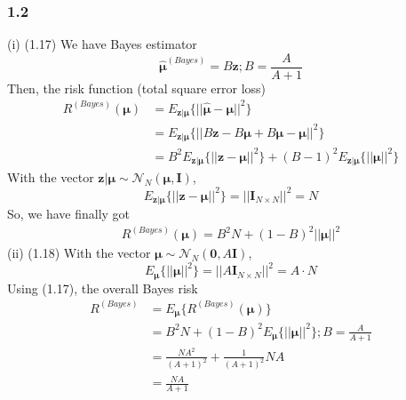 \documentclass{article}
\begin{document}
\subsubsection*{1.2}
(i) (1.17) \newline
We have Bayes estimator
\begin{displaymath}
\hat{\bm{\mu}}^{(Bayes)} = B\bm{z}; B = \frac{A}{A+1}
\end{displaymath}
Then, the risk function (total square error loss)
\begin{displaymath}
\begin{split}
R^{(Bayes)}(\bm{\mu}) &= E_{\bm{z|\mu}}\{||\hat{\bm{\mu}} - \bm{\mu}||^2\} \\
& = E_{\bm{z|\mu}}\{||B\bm{z} - B\bm{\mu} + B\bm{\mu} - \bm{\mu}||^2\} \\
& = B^2 E_{\bm{z|\mu}}\{||\bm{z} - \bm{\mu}||^2\} + (B-1)^2E_{\bm{z|\mu}}\{||\bm{\mu}||^2\}
\end{split}
\end{displaymath}
With the vector $\bm{z|\mu} \sim \mathcal{N}_N(\bm{\mu},\bm{I})$, 
\begin{displaymath}
E_{\bm{z|\mu}}\{||\bm{z} - \bm{\mu}||^2\} = ||\bm{I}_{N\times N}||^2 = N
\end{displaymath}
So, we have finally got
\begin{displaymath}
\begin{split}
R^{(Bayes)}(\bm{\mu}) = B^2 N + (1-B)^2 ||\bm{\mu}||^2
\end{split}
\end{displaymath}
(ii) (1.18) \newline
With the vector $\bm{\mu} \sim \mathcal{N}_N(\bm{0},A\bm{I})$, 
\begin{displaymath}
E_{\bm{\mu}} \{||\bm{\mu}||^2\} = ||A\bm{I}_{N\times N}||^2 = A\cdot N
\end{displaymath}
Using (1.17), the overall Bayes risk
\begin{displaymath}
\begin{split}
R^{(Bayes)} & = E_{\bm{\mu}}\{ R^{(Bayes)}(\bm{\mu}) \} \\
& = B^2 N + (1-B)^2 E_{\bm{\mu}} \{||\bm{\mu}||^2\}; B=\frac{A}{A+1} \\
& = \frac{NA^2}{(A+1)^2} + \frac{1}{(A+1)^2} NA \\
& = \frac{NA}{A+1}
\end{split}
\end{displaymath}
\end{document}
